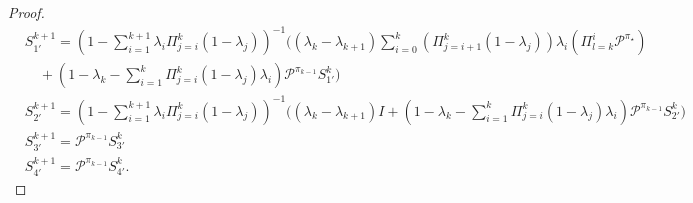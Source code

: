 \documentclass[10pt,a4paper]{amsart}
\newcommand{\cP}{\mathcal{P}}
\newcommand*{\para}[1]{\left({#1}\right)}
\begin{document}
\begin{proof}
\begin{align*}
    &S^{k+1}_{1'} = \para{1-\sum_{i=1}^{k+1} \lambda_i \Pi^{k}_{j=i} (1-\lambda_j)}^{-1} \bigg((\lambda_{k}-\lambda_{k+1})\sum_{i=0}^{k} (\Pi^k_{j=i+1} (1-\lambda_j)) \lambda_{i}\para{\Pi^{i}_{l=k}\cP^{\pi_{\star}}} 
    \\& \quad +\para{1-\lambda_k-\sum_{i=1}^{k}  \Pi^{k}_{j=i} (1-\lambda_j)\lambda_i}\cP^{\pi_{k-1}}S^k_{1'} \bigg) 
    \\&S^{k+1}_{2'} =\para{1-\sum_{i=1}^{k+1} \lambda_i \Pi^{k}_{j=i} (1-\lambda_j)}^{-1}\bigg((\lambda_{k}-\lambda_{k+1})I+\para{1-\lambda_k-\sum_{i=1}^{k}  \Pi^{k}_{j=i} (1-\lambda_j)\lambda_i}\cP^{\pi_{k-1}}S^{k}_{2'} \bigg)
    \\&S^{k+1}_{3'}=\cP^{\pi_{k-1}}S^{k}_{3'}
    \\&S^{k+1}_{4'}=\cP^{\pi_{k-1}}S^{k}_{4'}.
\end{align*}
\end{proof}
\end{document}
